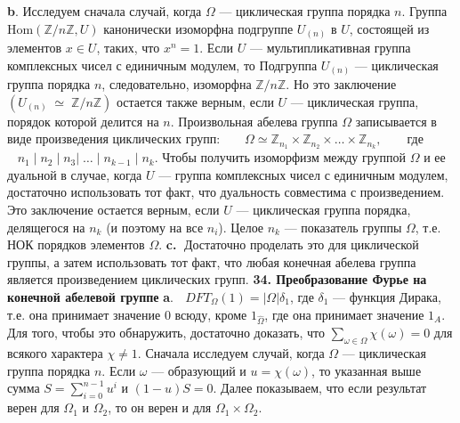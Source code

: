 \documentclass{../../template/mai_book}
\begin{document}
\textbf{b}. Исследуем сначала случай, когда $\Omega$ --- циклическая группа поряд­ка $n$. Группа Hom$(\mathds{Z}/n \mathds{Z},U)$ канонически изоморфна подгруппе $U_{(n)}$ в $U$, состоящей из элементов $x \in U$, таких, что $x^n = 1$. Если $U$ --- мультипликативная группа комплексных чисел с единичным модулем, то	
\newpage
\noindent
Подгруппа $U_{(n)}$ --- циклическая группа порядка $n$, следовательно, изоморфна $\mathds{Z}/n\mathds{Z}$. Но это заключение $(U_{(n)} \; \simeq \; \mathds{Z}/n\mathds{Z})$ остается также верным, если $U$ --- циклическая группа, порядок которой делится на $n$. \newline
\indent Произвольная абелева группа $\Omega$ записывается в виде произведения циклических групп: \newline \newline \indent
$\; \; \; \; \; \; \Omega \simeq \mathds{Z}_{n_1} \times \mathds{Z}_{n_2} \times \dots \times \mathds{Z}_{n_k}, \; \; \; \; \; \;$ где $\; \; \; n_1 \; | \; n_2 \; | \; n_3 | \; \dots \; | \; n_{k-1} \; | \; n_k$. \newline \newline
Чтобы получить изоморфизм между группой $\Omega$ и ее дуальной в случае, когда $U$ --- группа комплексных чисел с единичным модулем, достаточно использовать тот факт, что дуальность совместима с произведением. Это заключение остается верным, если $U$ --- циклическая группа порядка, делящегося на $n_k$ (и поэтому на все $n_i$). Целое $n_k$ --- показатель группы $\Omega$, т.е. НОК порядков элементов $\Omega$. \newline \indent
\textbf{c.}$\;$ Достаточно проделать это для циклической группы, а затем использовать тот факт, что любая конечная абелева группа является произведением циклических групп. \newline \newline
\textbf{34. Преобразование Фурье на конечной абелевой группе} \newline \newline \indent
\textbf{a}. $\;$ $DFT_{\Omega}(1) = |\Omega|\delta_1$, где $\delta_1$ --- функция Дирака, т.е. она принимает значение $0$ всюду, кроме $1_{\hat \Omega}$, где она принимает значение $1_A$. Для того, чтобы это обнаружить, достаточно доказать, что $\sum_{\omega \in \Omega} \chi(\omega) = 0$ для всякого характера $\chi \neq 1$. Сначала исследуем случай, когда $\Omega$ --- циклическая группа порядка $n$. Если $\omega$ --- образующий и $u = \chi(\omega)$, то указанная выше сумма $S = \sum_{i = 0}^{n-1}u^i$ и $(1 - u)S = 0$. Далее показываем, что если результат верен для $\Omega_1$ и $\Omega_2$, то он верен и для $\Omega_1 \times \Omega_2$. \newline \indent
\end{document}
